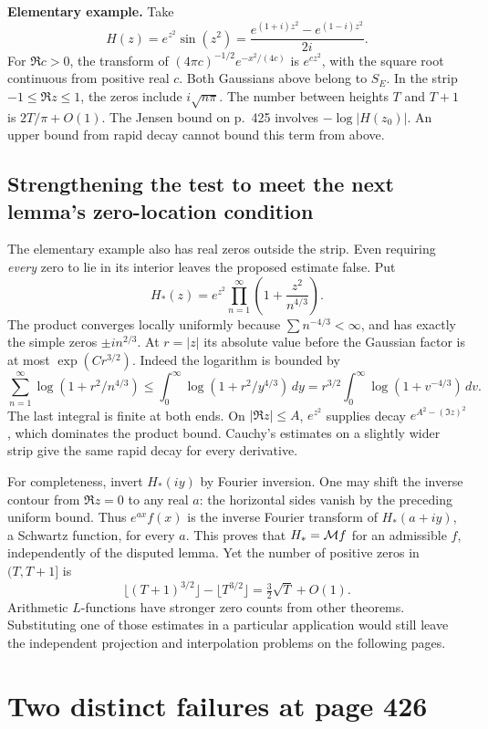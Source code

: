 \documentclass[11pt,reqno]{amsart}
\numberwithin{equation}{section}
\begin{document}
\textbf{Elementary example.} Take
\[
 H(z)=e^{z^2}\sin(z^2)=\frac{e^{(1+i)z^2}-e^{(1-i)z^2}}{2i}.
\]
For \(\Re c>0\), the transform of \((4\pi c)^{-1/2}e^{-x^2/(4c)}\) is \(e^{cz^2}\), with the square root continuous from positive real \(c\). Both Gaussians above belong to \(S_E\). In the strip \(-1\le\Re z\le1\), the zeros include \(i\sqrt{n\pi}\). The number between heights \(T\) and \(T+1\) is \(2T/\pi+O(1)\). The Jensen bound on p.~425 involves \(-\log|H(z_0)|\). An upper bound from rapid decay cannot bound this term from above.

\subsection*{Strengthening the test to meet the next lemma's zero-location condition}
The elementary example also has real zeros outside the strip. Even requiring \emph{every} zero to lie in its interior leaves the proposed estimate false. Put
\[
 H_*(z)=e^{z^2}\prod_{n=1}^\infty\left(1+\frac{z^2}{n^{4/3}}\right).
\]
The product converges locally uniformly because \(\sum n^{-4/3}<\infty\), and has exactly the simple zeros \(\pm i n^{2/3}\). At \(r=|z|\) its absolute value before the Gaussian factor is at most \(\exp(C r^{3/2})\). Indeed the logarithm is bounded by
\[
 \sum_{n=1}^\infty\log(1+r^2/n^{4/3})
 \le\int_0^\infty\log(1+r^2/y^{4/3})\,dy
 =r^{3/2}\int_0^\infty\log(1+v^{-4/3})\,dv .
\]
The last integral is finite at both ends. On \(|\Re z|\le A\), \(e^{z^2}\) supplies decay \(e^{A^2-(\Im z)^2}\), which dominates the product bound. Cauchy's estimates on a slightly wider strip give the same rapid decay for every derivative.

For completeness, invert \(H_*(iy)\) by Fourier inversion. One may shift the inverse contour from \(\Re z=0\) to any real \(a\): the horizontal sides vanish by the preceding uniform bound. Thus \(e^{ax}f(x)\) is the inverse Fourier transform of \(H_*(a+iy)\), a Schwartz function, for every \(a\). This proves that \(H_*=\mathcal M f\) for an admissible \(f\), independently of the disputed lemma. Yet the number of positive zeros in \((T,T+1]\) is
\[
 \lfloor(T+1)^{3/2}\rfloor-\lfloor T^{3/2}\rfloor
 =\tfrac32\sqrt T+O(1).
\]
Arithmetic \(L\)-functions have stronger zero counts from other theorems. Substituting one of those estimates in a particular application would still leave the independent projection and interpolation problems on the following pages.


\section{Two distinct failures at page 426}\label{sec:6}
\end{document}
